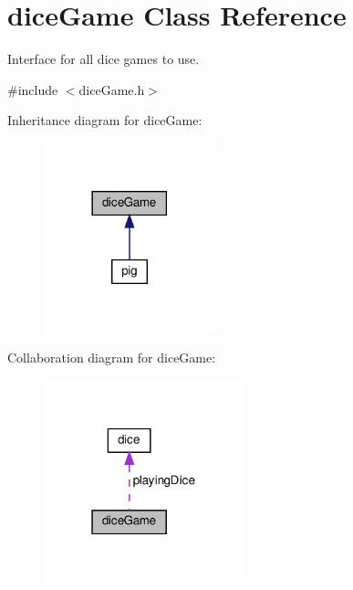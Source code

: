 \hypertarget{classdiceGame}{}\section{dice\+Game Class Reference}
\label{classdiceGame}


Interface for all dice games to use.  




{\ttfamily \#include $<$dice\+Game.\+h$>$}



Inheritance diagram for dice\+Game\+:\nopagebreak
\begin{figure}[H]
\begin{center}
\leavevmode
\includegraphics[width=141pt]{classdiceGame__inherit__graph}
\end{center}
\end{figure}


Collaboration diagram for dice\+Game\+:\nopagebreak
\begin{figure}[H]
\begin{center}
\leavevmode
\includegraphics[width=166pt]{classdiceGame__coll__graph}
\end{center}
\end{figure}
